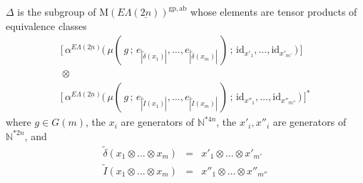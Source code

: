 \documentclass{amsbook} %
\newcommand{\id}{\textrm{id}}
\newcommand{\ELnn}{E\Lambda(\underline{2n})}
\numberwithin{section}{chapter}
\begin{document}
\begin{lem} $\Delta$ is the subgroup of $\mathrm{M}(\ELnn)^{\mathrm{gp, ab}}$ whose elements are tensor products of equivalence classes
\[ \begin{array}{c}
			\big[ \, \alpha^{\ELnn}\big( \, \mu( \, g \, ; \, e_{|\tilde{\delta}(x_1)|}, \ldots, e_{|\tilde{\delta}(x_m)|} \, ) \, ; \, \id_{x'_1}, \ldots,  \id_{x'_{m'}} \, \big) \, \big] \\
			\, \otimes \, \\
			\big[ \, \alpha^{\ELnn}\big( \, \mu( \, g \, ; \, e_{|\tilde{I}(x_1)|}, \ldots, e_{|\tilde{I}(x_m)|} \, ) \, ; \, \id_{x''_1}, \ldots,  \id_{x''_{m''}} \, \big) \, \big]^*
		\end{array}
\] 
where $g \in G(m)$, the $x_i$ are generators of $\mathbb{N}^{\ast 4n}$, the $x'_i, x''_i$ are generators of $\mathbb{N}^{\ast 2n}$, and
\[ \begin{array}{rll}
			\tilde{\delta}( x_1 \otimes \ldots \otimes x_m) & = & x'_1 \otimes \ldots \otimes x'_{m'} \\
			\tilde{I}( x_1 \otimes \ldots \otimes x_m) & = & x''_1 \otimes \ldots \otimes x''_{m''}
		\end{array}
\]
\end{lem}
\end{document}
